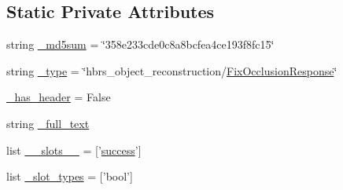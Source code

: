 \subsection*{\-Static \-Private \-Attributes}
\begin{DoxyCompactItemize}
\item 
string \hyperlink{classhbrs__object__reconstruction_1_1srv_1_1___fix_occlusion_1_1_fix_occlusion_response_abf3ed9edf37a87be3b2b3db001fd7093}{\-\_\-md5sum} = \char`\"{}358e233cde0c8a8bcfea4ce193f8fc15\char`\"{}
\item 
string \hyperlink{classhbrs__object__reconstruction_1_1srv_1_1___fix_occlusion_1_1_fix_occlusion_response_a810da3eb10fb6c6764b1e8106ba2ba20}{\-\_\-type} = \char`\"{}hbrs\-\_\-object\-\_\-reconstruction/\hyperlink{classhbrs__object__reconstruction_1_1srv_1_1___fix_occlusion_1_1_fix_occlusion_response}{\-Fix\-Occlusion\-Response}\char`\"{}
\item 
\hyperlink{classhbrs__object__reconstruction_1_1srv_1_1___fix_occlusion_1_1_fix_occlusion_response_af5f60028e9eb9fb663ad6b7a5c97f294}{\-\_\-has\-\_\-header} = \-False
\item 
string \hyperlink{classhbrs__object__reconstruction_1_1srv_1_1___fix_occlusion_1_1_fix_occlusion_response_a55f06221a6eccb31a01126c17d9fe326}{\-\_\-full\-\_\-text}
\item 
list \hyperlink{classhbrs__object__reconstruction_1_1srv_1_1___fix_occlusion_1_1_fix_occlusion_response_a2b8ac097ef109ec5eddb004f94ed0d95}{\-\_\-\-\_\-slots\-\_\-\-\_\-} = \mbox{[}'\hyperlink{classhbrs__object__reconstruction_1_1srv_1_1___fix_occlusion_1_1_fix_occlusion_response_a440ad61396277551c4f88a93eb92373a}{success}'\mbox{]}
\item 
list \hyperlink{classhbrs__object__reconstruction_1_1srv_1_1___fix_occlusion_1_1_fix_occlusion_response_a691ac9e75ea5713f074e11895689c0d2}{\-\_\-slot\-\_\-types} = \mbox{[}'bool'\mbox{]}
\end{DoxyCompactItemize}


